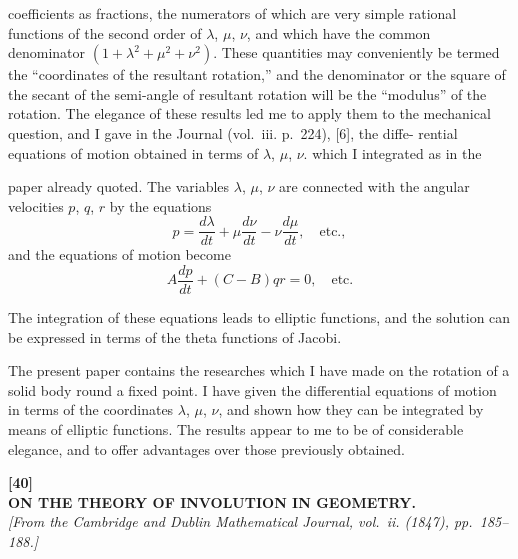 \documentclass[11pt,a4paper]{book}
\begin{document}
coefficients as fractions, the numerators of which are very simple rational functions of
the second order of $\lambda$, $\mu$, $\nu$, and which have the common denominator $(1 + \lambda^2 + \mu^2 + \nu^2)$.
These quantities may conveniently be termed the ``coordinates of the resultant rotation,''
and the denominator or the square of the secant of the semi-angle of resultant rotation
will be the ``modulus'' of the rotation. The elegance of these results led me to apply
them to the mechanical question, and I gave in the Journal (vol.~iii. p.~224), [6], the diffe-
rential equations of motion obtained in terms of $\lambda$, $\mu$, $\nu$. which I integrated as in the

\newpage
\setcounter{page}{239}

paper already quoted. The variables $\lambda$, $\mu$, $\nu$ are connected with the angular velocities
$p$, $q$, $r$ by the equations
\[
p = \frac{d\lambda}{dt} + \mu\frac{d\nu}{dt} - \nu\frac{d\mu}{dt}, \quad \text{etc.},
\]
and the equations of motion become
\[
A\frac{dp}{dt} + (C-B)qr = 0, \quad \text{etc.}
\]

The integration of these equations leads to elliptic functions, and the solution can
be expressed in terms of the theta functions of Jacobi.

\newpage
\setcounter{page}{240}

The present paper contains the researches which I have made on the rotation of a
solid body round a fixed point. I have given the differential equations of motion in
terms of the coordinates $\lambda$, $\mu$, $\nu$, and shown how they can be integrated by means of
elliptic functions. The results appear to me to be of considerable elegance, and to offer
advantages over those previously obtained.
\clearpage


\setlength{\parindent}{1em}
\setlength{\parskip}{0pt}


\begin{center}
\textbf{[40]}\\[4pt]
\textbf{\large ON THE THEORY OF INVOLUTION IN GEOMETRY.}\\[4pt]
\textit{[From the Cambridge and Dublin Mathematical Journal, vol.~ii. (1847), pp.~185--188.]}
\end{center}
\end{document}
